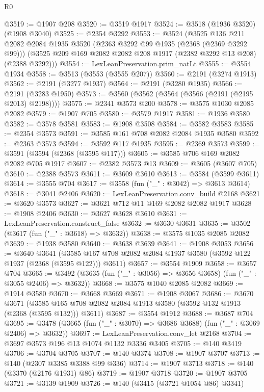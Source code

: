 \begin{lexlean}{R0}
\begin{coremodule}
@3519 := @1907 @208
@3520 := @3519 @1917
@3524 := @3518 (@1936 @3520) (@1908 @3040)
@3525 := @2354 @3292
@3553 := @3524
    (@3525
      @136
      @211
      @2082
      @2084
      @1935
      @3520
      (@2363 @3292 @99 @1935 (@2368 (@2369 @3292 @99)))
      (@3525 @209 @169 @2082 @2082 @208 @1917 (@2382 @3292 @13 @208) (@2388 @3292)))
@3554 := LexLeanPreservation.prim_natLt
@3555 := @3554 @1934
@3558 := @3513 (@3553 (@3555 @207))
@3560 := @2191 (@3274 @1913)
@3562 := @2191 (@3277 @1937)
@3564 := @2191 (@3280 @1935)
@3566 := @2191 (@3283 @1950)
@3573 := @3560 (@3562 (@3564 (@3566 (@2191 (@2195 @2013) @2198))))
@3575 := @2341 @3573 @200
@3578 := @3575 @1030 @2085 @2082
@3579 := @1907 @705
@3580 := @3579 @1917
@3581 := @1936 @3580
@3582 := @3578 @3581
@3583 := @1908 @3508
@3584 := @3582 @3583
@3585 := @2354 @3573
@3591 := @3585 @161 @708 @2082 @2084 @1935 @3580
@3592 := @2363 @3573
@3594 := @3592 @117 @1935
@3595 := @2369 @3573
@3599 := @3591 (@3594 (@2368 (@3595 @117)))
@3605 := @3585 @706 @169 @2082 @2082 @705 @1917
@3607 := @2382 @3573 @13
@3609 := @3605 (@3607 @705)
@3610 := @2388 @3573
@3611 := @3609 @3610
@3613 := @3584 (@3599 @3611)
@3614 := @3555 @704
@3617 := @3558 (fun ("_" : @3042) => @3613 @3614)
@3618 := @3041 @2406
@3620 := LexLeanPreservation.conv_build @2168
@3621 := @3620 @3573
@3627 := @3621 @712 @11 @169 @2082 @2082 @1917
@3628 := @1908 @2406
@3630 := @3627 @3628 @3610
@3631 := LexLeanPreservation.construct_false
@3632 := @3630 @3631
@3635 := @3502 (@3617 (fun ("_" : @3618) => @3632))
@3638 := @3575 @1035 @2085 @2082
@3639 := @1938 @3580
@3640 := @3638 @3639
@3641 := @1908 @3053
@3656 := @3640
    @3641
    (@3585 @167 @708 @2082 @2084 @1937 @3580 (@3592 @122 @1937 (@2368 (@3595 @122))) @3611)
@3657 := @3554 @1909
@3658 := @3657 @704
@3665 := @3492 (@3635 (fun ("_" : @3056) => @3656 @3658) (fun ("_" : @3055 @2406) => @3632))
@3668 := @3575 @1040 @2085 @2082
@3669 := @1914 @3580
@3670 := @3668 @3669
@3671 := @1908 @3067
@3686 := @3670
    @3671
    (@3585 @165 @708 @2082 @2084 @1913 @3580 (@3592 @132 @1913 (@2368 (@3595 @132))) @3611)
@3687 := @3554 @1912
@3688 := @3687 @704
@3695 := @3478 (@3665 (fun ("_" : @3070) => @3686 @3688) (fun ("_" : @3069 @2406) => @3632))
@3697 := LexLeanPreservation.conv_let @2168
@3704 := @3697 @3573 @196 @13 @1074 @1132 @3336 @3405
@3705 := @140 @3419
@3706 := @3704 @3705
@3707 := @140 @3374
@3708 := @1907 @3707
@3713 := @140 (@2307 @3385 @3388 @99 @336)
@3714 := @1907 @3713
@3718 := @140 (@3370 (@2176 @1931) @86)
@3719 := @1907 @3718
@3720 := @1907 @3705
@3721 := @3139 @1909
@3726 := @140 (@3415 (@3721 @1054 @86) @3341)

\end{coremodule}
\end{lexlean}
